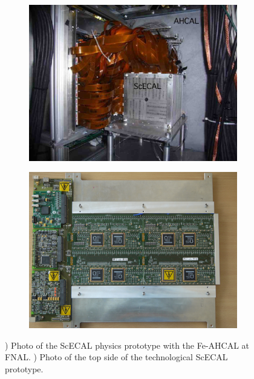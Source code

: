 \begin{figure}[htbp!]
  \centering
  \begin{subfigure}[t]{0.49\textwidth}
    \includegraphics[width=1.\linewidth]{chap3/fig/photo_scecal2.pdf}
    \caption{} \label{fig:ScECALPhysics}
  \end{subfigure}
  \hfill
  \begin{subfigure}[t]{0.49\textwidth}
    \includegraphics[width=1.\linewidth]{chap3/fig/P1060076.jpeg}
    \caption{} \label{fig:ScECALTechno}
  \end{subfigure}
  \caption{) Photo of the ScECAL physics prototype with the Fe-AHCAL at FNAL. ) Photo of the top side of the technological ScECAL prototype.}
\end{figure}

